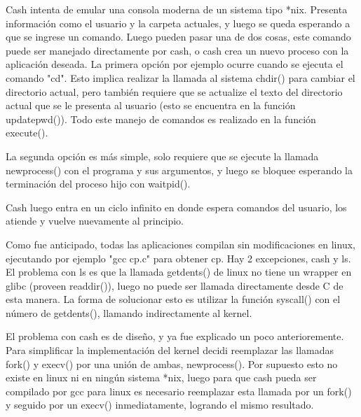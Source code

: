 Cash intenta de emular una consola moderna de un sistema tipo *nix. Presenta
información como el usuario y la carpeta actuales, y luego se queda
esperando a que se ingrese un comando. Luego pueden pasar una de dos cosas,
este comando puede ser manejado directamente por cash, o cash crea un nuevo
proceso con la aplicación deseada. La primera opción por ejemplo ocurre cuando
se ejecuta el comando "cd". Esto implica realizar la llamada al sistema chdir()
para cambiar el directorio actual, pero también requiere que se actualize el
texto del directorio actual que se le presenta al usuario (esto se encuentra en
la función updatepwd()). Todo este manejo de comandos es realizado en la
función execute().

La segunda opción es más simple, solo requiere que se ejecute la llamada
newprocess() con el programa y sus argumentos, y luego se bloquee esperando la
terminación del proceso hijo con waitpid().

Cash luego entra en un ciclo infinito en donde espera comandos del usuario, los
atiende y vuelve nuevamente al principio.

Como fue anticipado, todas las aplicaciones compilan sin modificaciones en
linux, ejecutando por ejemplo "gcc cp.c" para obtener cp. Hay 2 excepciones,
cash y ls. El problema con ls es que la llamada getdents() de linux no tiene un
wrapper en glibc (proveen readdir()), luego no puede ser llamada directamente
desde C de esta manera. La forma de solucionar esto es utilizar la función
syscall() con el número de getdents(), llamando indirectamente al kernel.

El problema con cash es de diseño, y ya fue explicado un poco anterioremente.
Para simplificar la implementación del kernel decidi reemplazar las llamadas
fork() y execv() por una unión de ambas, newprocess(). Por supuesto esto no
existe en linux ni en ningún sistema *nix, luego para que cash pueda ser
compilado por gcc para linux es necesario reemplazar esta llamada por un
fork() y seguido por un execv() inmediatamente, logrando el mismo resultado.

